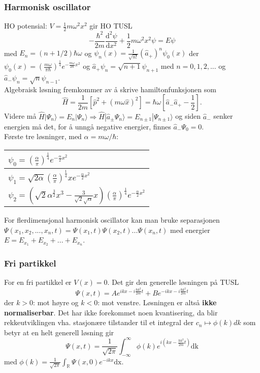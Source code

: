 \documentclass[a4paper, norsk, 8pt]{article}
\newcommand{\ket}[1] { |#1\rangle }
\begin{document}
\begin{multicols*}{3}
\subsubsection*{\scriptsize Harmonisk oscillator} 
HO potensial: $V = \frac{1}{2}m\omega^2 x^2$ gir HO TUSL
\[ -\frac{\hbar^2}{2m}\frac{\mbox{d}^2\psi}{\mbox{d}x^2}+\frac{1}{2}m\omega^2x^2\psi=E\psi \]
med $E_n=\left(n+1/2\right)\hbar \omega $ og $\psi_n(x)=\frac{1}{\sqrt{n!}} (\hat{a}_+)^n \psi_0(x)$ der $\psi_0(x)=\left(\frac{m\omega}{\pi \hbar}\right)^{\frac{1}{4}}e^{-\frac{m\omega}{2\hbar}x^2}$ og $\hat{a}_+ \psi_{n}= \sqrt{n+1}\psi_{n+1}$ med $n=0,1,2,...$ og $\hat{a}_- \psi_{n}= \sqrt{n}\psi_{n-1}$. \\
Algebraisk løsning fremkommer av å skrive hamiltonfunksjonen som \[\hat{H}=\frac{1}{2m}\left[\hat{p}^2+(m\omega \hat{x})^2\right]=\hbar \omega \left[\hat{a}_-\hat{a}_+-\frac{1}{2}\right].\]
Videre må $\hat{H}\ket{\Psi_n}=E_n\ket{\Psi_n}\Rightarrow\hat{H}\ket{\hat{a}_\pm \Psi_n}=E_{n\pm 1}\ket{\Psi_{n\pm 1}}$ og siden $\hat{a}_-$ senker energien må det, for å unngå negative energier, finnes $\hat{a}_-\Psi_0=0$. \\
Første tre løsninger, med $\alpha=m\omega/\hbar$:\\
\begin{tabular}{ |l|}
\hline
$\psi_0 = \left(\frac{\alpha}{\pi}\right)^\frac{1}{4}e^{-\frac{\alpha}{2}x^2}$ \\ \hline
$\psi_1 = \sqrt{2\alpha}\left(\frac{\alpha}{\pi}\right)^\frac{1}{4}xe^{-\frac{\alpha}{2}x^2}$  \\ \hline
$\psi_2 = \left(\sqrt{2}\alpha^\frac{3}{2}x^3-\frac{3}{\sqrt{2}\sqrt{\alpha}}x \right)\left(\frac{\alpha}{\pi}\right)^\frac{1}{4}e^{-\frac{\alpha}{2}x^2}$ \\ \hline
\end{tabular}

For flerdimensjonal harmonisk oscillator kan man bruke separasjonen $\Psi(x_1,x_2,...,x_n,t)=\Psi(x_1,t)\Psi(x_2,t)...\Psi(x_n,t)$ med energier $E=E_{x_1}+E_{x_2}+...+E_{x_n}$.


\subsubsection*{\scriptsize Fri partikkel}
For en fri partikkel er $V(x)=0$. Det gir den generelle løsningen på TUSL
\[ \Psi(x,t)=Ae^{ikx-i\frac{\hbar k^2}{2m}t}+Be^{-ikx-i\frac{\hbar k^2}{2m}t} \]
der $k>0$: mot høyre og $k<0$: mot venstre. Løsningen er altså \textbf{ikke normaliserbar}.
Det har ikke forekommet noen kvantisering, da blir rekkeutviklingen vha. stasjonære tilstander til et integral der $c_n\mapsto \phi(k)dk$ som betyr at en helt generell løsning gir
\[ \Psi(x,t)=\frac{1}{\sqrt{2\pi}}\int_{-\infty}^\infty \phi(k)e^{i(kx-\frac{\hbar k^2}{2m}t)}\mbox{dk} \]
med $\phi(k)=\frac{1}{\sqrt{2\pi}} \int_{\mathbb{R}}\Psi(x,0)e^{-ikx}\mbox{dx}$.



\end{multicols*}
\end{document}
